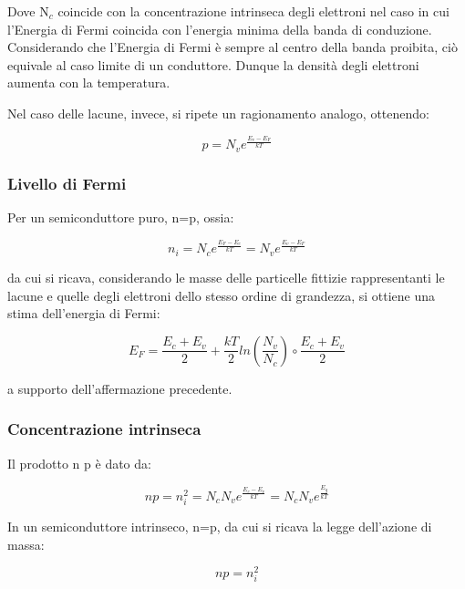 \documentclass{article}
\begin{document}
Dove N$_c$ coincide con la concentrazione intrinseca degli elettroni nel caso in cui l'Energia di Fermi coincida con l'energia minima della banda di conduzione.
Considerando che l'Energia di Fermi è sempre al centro della banda proibita, ciò equivale al caso limite di un conduttore.
Dunque la densità degli elettroni aumenta con la temperatura.

Nel caso delle lacune, invece, si ripete un ragionamento analogo, ottenendo:

\begin{equation}
    p = N_v e^{\frac{E_v-E_F}{kT}}
\end{equation}

\subsubsection{Livello di Fermi}

Per un semiconduttore puro, n=p, ossia:

\begin{equation}
    n_i = N_c e^{\frac{E_F-E_c}{kT}} = N_v e^{\frac{E_v-E_F}{kT}}
\end{equation}

da cui si ricava, considerando le masse delle particelle fittizie rappresentanti le lacune e quelle degli elettroni dello stesso ordine di grandezza, si ottiene
una stima dell'energia di Fermi:

\begin{equation}
    E_F = \frac{E_c + E_v}{2} + \frac{kT}{2} ln(\frac{N_v}{N_c})\circ \frac{E_c+E_v}{2}
\end{equation}

a supporto dell'affermazione precedente.

\subsubsection{Concentrazione intrinseca}

Il prodotto n p è dato da:

\begin{equation}
    n p = n_i^2 = N_c N_v e^{\frac{E_c-E_v}{kT}}= N_c N_v e^{\frac{E_g}{kT}}
\end{equation}

In un semiconduttore intrinseco, n=p, da cui si ricava la legge dell'azione di massa:

\begin{equation}
    np = n_i^2
\end{equation}
\end{document}
